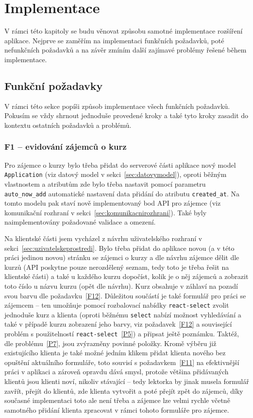 \chapter{Implementace}

V rámci této kapitoly se budu věnovat způsobu samotné implementace rozšíření aplikace. Nejprve se zaměřím na implementaci funkčních požadavků, poté nefunkčních požadavků a na závěr zmíním další zajímavé problémy řešené během implementace.

\section{Funkční požadavky}

V rámci této sekce popíši způsob implementace všech funkčních požadavků. Pokusím se vždy shrnout jednoduše provedené kroky a také tyto kroky zasadit do kontextu ostatních požadavků a problémů.


\subsection{F1 -- evidování zájemců o kurz}

Pro zájemce o kurzy bylo třeba přidat do serverové části aplikace nový model \verb|Application| (viz datový model v sekci~\ref{sec:datovymodel}), oproti běžným vlastnostem a atributům zde bylo třeba nastavit pomocí parametru \verb|auto_now_add| automatické nastavení data přidání do atributu \verb|created_at|. Na tomto modelu pak staví nově implementovaný bod API pro zájemce (viz komunikační rozhraní v sekci~\ref{sec:komunikacnirozhrani}). Také byly naimplementovány požadované validace a omezení.

Na klientské části jsem vycházel z návrhu uživatelského rozhraní v sekci~\ref{sec:uzivatelskeprostredi}. Bylo třeba přidat do aplikace novou (a v této práci jedinou novou) stránku se zájemci o kurzy a dle návrhu zájemce dělit dle kurzů (API poskytne pouze nerozdělený seznam, tedy toto je třeba řešit na klientské části) a také u každého kurzu dopočíst, kolik je o něj zájemců a zobrazit toto číslo u názvu kurzu (opět dle návrhu). Kurz obsahuje v záhlaví na pozadí svou barvu dle požadavku~\ref{F12}. Důležitou součástí je také formulář pro práci se zájemcem -- ten umožňuje pomocí rozbalovací nabídky \verb|react-select| zvolit jednoduše kurz a klienta (oproti běžnému \verb|select| nabízí možnost vyhledávání a také v případě kurzu zobrazení jeho barvy, viz požadavek~\ref{F12} a související problém s použitelností \verb|react-select|~\ref{P5}) a připsat ještě poznámku. Taktéž, dle problému~\ref{P7}, jsou zvýrazněny povinné položky. Kromě výběru již existujícího klienta je také možné jedním klikem přidat klienta nového bez opuštění aktuálního formuláře, toto souvisí s požadavkem~\ref{F11} na efektivnější práci v aplikaci a zároveň opravdu dává smysl, protože většina přidávaných klientů jsou klienti noví, nikoliv stávající -- tedy lektorka by jinak musela formulář zavřít, přejít do klientů, zde klienta vytvořit a poté přejít zpět do zájemců, díky současné implementaci toto ale není třeba a zájemce lze velmi rychle včetně samotného přidání klienta zpracovat v rámci tohoto formuláře pro zájemce.

